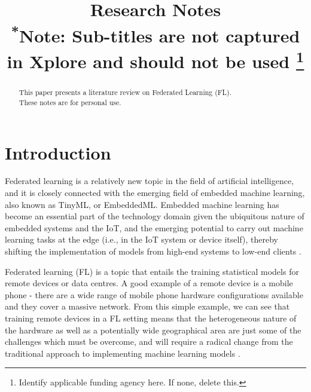 \documentclass[conference]{IEEEtran}
\begin{document}
\title{Research Notes\\
{\footnotesize \textsuperscript{*}Note: Sub-titles are not captured in Xplore and
should not be used}
\thanks{Identify applicable funding agency here. If none, delete this.}
}


\author{
}

\maketitle

\begin{abstract}
This paper presents a literature review on Federated Learning (FL). \\
\noindent These notes are for personal use.
\end{abstract}

\begin{IEEEkeywords}

\end{IEEEkeywords}

\section{Introduction}
Federated learning is a relatively new topic in the field of artificial intelligence, and it is closely connected with the emerging field of embedded machine learning, also known as TinyML, or EmbeddedML. Embedded machine learning has become an essential part of the technology domain given the ubiquitous nature of embedded systems and the IoT, and the emerging potential to carry out machine learning tasks at the edge (i.e., in the IoT system or device itself), thereby shifting the implementation of models from high-end systems to low-end clients \cite{b1}.

Federated learning (FL) is a topic that entails the training statistical models for remote devices or data centres. A good example of a remote device is a mobile phone - there are a wide range of mobile phone hardware configurations available and they cover a massive network. From this simple example, we can see that training remote devices in a FL setting means that the heterogeneous nature of the hardware as well as a potentially wide geographical area are just some of the challenges which must be overcome, and will require a radical change from the traditional approach to implementing machine learning models \cite{b2}.
\end{document}
